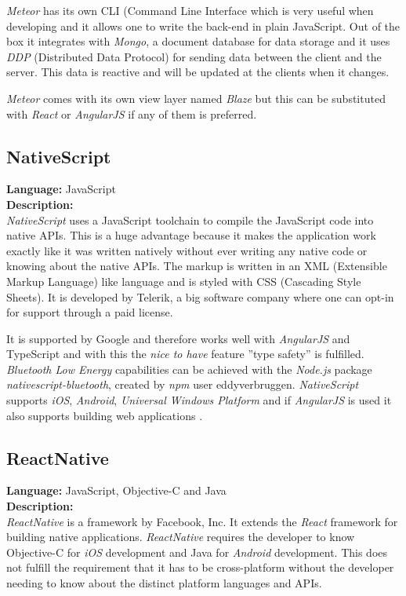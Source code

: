 \textit{Meteor} has its own CLI (Command Line Interface which is very useful when developing and it allows one to write the back-end in plain JavaScript. 
Out of the box it integrates with \textit{Mongo}, a document database for data storage and it uses \textit{DDP} (Distributed Data Protocol) for sending data between the client and the server. 
This data is reactive and will be updated at the clients when it changes.

\textit{Meteor} comes with its own view layer named \textit{Blaze} but this can be substituted with \textit{React} or \textit{AngularJS} if any of them is preferred.

\subsection*{NativeScript}
\textbf{Language:} JavaScript
\\
\textbf{Description:}
\\
\textit{NativeScript} uses a JavaScript toolchain to compile the JavaScript code into native APIs. 
This is a huge advantage because it makes the application work exactly like it was written natively without ever writing any native code or knowing about the native APIs. 
The markup is written in an XML (Extensible Markup Language) like language and is styled with CSS (Cascading Style Sheets).
It is developed by Telerik, a big software company where one can opt-in for support through a paid license. 

It is supported by Google and therefore works well with \textit{AngularJS} and TypeScript and with this the \textit{nice to have} feature ''type safety'' is fulfilled. 
\textit{Bluetooth Low Energy} capabilities can be achieved with the \textit{Node.js} package \textit{nativescript-bluetooth}, created by \textit{npm} user eddyverbruggen. 
\textit{NativeScript} supports \textit{iOS}, \textit{Android}, \textit{Universal Windows Platform} and if \textit{AngularJS} is used it also supports building web applications \citep{preStudy:frameworks:nativescript}.


\subsection*{ReactNative}
\textbf{Language:} JavaScript, Objective-C and Java
\\
\textbf{Description:}
\\
\textit{ReactNative} is a framework by Facebook, Inc.
It extends the \textit{React} framework for building native applications. 
\textit{ReactNative} requires the developer to know Objective-C for \textit{iOS} development and Java for \textit{Android} development. 
This does not fulfill the requirement that it has to be cross-platform without the developer needing to know about the distinct platform languages and APIs.


